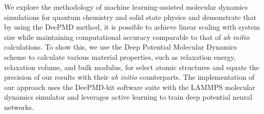We explore the methodology of machine learning-assisted molecular dynamics
simulations for quantum chemistry and solid state physics and demonstrate that
by using the DeePMD method, it is possible to achieve linear scaling with
system size while maintaining computational accuracy comparable to that of
\textit{ab initio} calculations. To show this, we use the Deep Potential
Molecular Dynamics scheme to calculate various material properties, such as
relaxation energy, relaxation volume, and bulk modulus, for select atomic
structures and equate the precision of our results with their
\textit{ab initio} counterparts. The implementation of our approach uses the
DeePMD-kit software suite with the LAMMPS molecular dynamics simulator and
leverages active learning to train deep potential neural networks.

